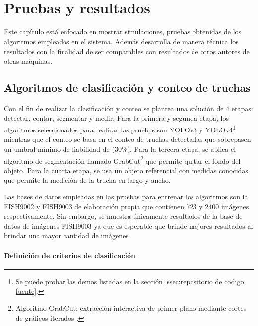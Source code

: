 
\pagestyle{myportland}
\doublespacing
\chapter[\quad\quad\quad\quad ----- Pruebas y resultados]{\\ Pruebas y resultados}
\thispagestyle{myportland}

Este capítulo está enfocado en mostrar simulaciones, pruebas obtenidas de los algoritmos empleados en el sistema. Además desarrolla de manera técnica los resultados con la finalidad de ser comparables con resultados de otros autores de otras máquinas.

\section{Algoritmos de clasificación y conteo de truchas}

Con el fin de realizar la clasificación y conteo se plantea una solución de 4 etapas: detectar, contar, segmentar y medir. Para la primera y segunda etapa, los algoritmos seleccionados para realizar las pruebas son YOLOv3 y YOLOv4\footnote{Se puede probar las demos listadas en la sección \ref{ssec:repositorio de codigo fuente}.} mientras que el conteo se basa en el conteo de truchas detectadas que sobrepasen un umbral mínimo de fiabilidad de (30\%). Para la tercera etapa, se aplica el algoritmo de segmentación llamado GrabCut\footnote{Algoritmo GrabCut: extracción interactiva de primer plano mediante cortes de gráficos iterados \cite{Rother2004}.} que permite quitar el fondo del objeto. Para la cuarta etapa, se usa un objeto referencial con medidas conocidas que permite la medición de la trucha en largo y ancho.

Las bases de datos empleadas en las pruebas para entrenar los algoritmos son la FISH9002 y FISH9003 de elaboración propia que contienen 723 y 2400 imágenes respectivamente. Sin embargo, se muestra únicamente resultados de la base de datos de imágenes FISH9003 ya que es esperable que brinde mejores resultados al brindar una mayor cantidad de imágenes.


\subsubsection{Definición de criterios de clasificación}

